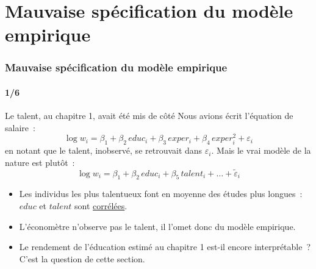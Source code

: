 \documentclass[10pt]{beamer}
\begin{document}
\section{Mauvaise spécification du modèle empirique}

\begin{frame}
  \frametitle{Mauvaise spécification du modèle empirique}
  \framesubtitle{1/6}

  \begin{exemple}{Le talent, au chapitre 1, avait été mis de côté}
    Nous avions écrit l'équation de salaire~:
    \[
      \log w_i = \beta_1 + \beta_2\, educ_i + \beta_3\, exper_i + \beta_4\, exper_i^2 + \varepsilon_i
    \]
    en notant que le talent, inobservé, se retrouvait dans $\varepsilon_i$.
    Mais le vrai modèle de la nature est plutôt~:
    \[
      \log w_i = \beta_1 + \beta_2\, educ_i + \beta_5\, talent_i + \dots + \tilde\varepsilon_i
    \]
  \end{exemple}

  \bigskip

  \begin{itemize}

  \item Les individus les plus talentueux font en moyenne des études plus longues~:
    $educ$ et $talent$ sont \underline{corrélées}.\newline

  \item L'économètre n'observe pas le talent, il l'omet donc du modèle empirique.\newline

  \item[\dbend] Le rendement de l'éducation estimé au chapitre 1 est-il encore
    interprétable~? C'est la question de cette section.

  \end{itemize}

\end{frame}
\end{document}

